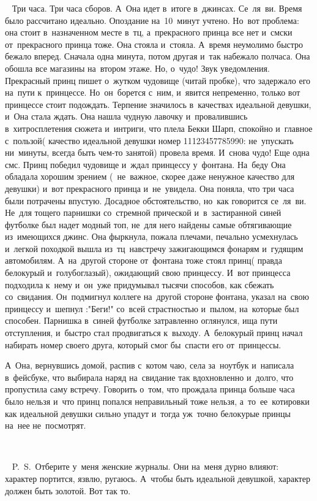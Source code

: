~
Три часа.
Три часа сборов.
А~Она идет в~итоге в~джинсах.
Се~ля~ви.
Время было рассчитано идеально.
Опоздание на~10~минут учтено.
Но~вот проблема: она стоит в~назначенном месте в~тц, а~прекрасного принца все нет и~смски от~прекрасного принца тоже.
Она стояла и~стояла.
А~время неумолимо быстро бежало вперед.
Сначала одна минута, потом другая и~так набежало полчаса.
Она обошла все магазины на~втором этаже.
Но, о~чудо! Звук уведомления.
Прекрасный принц пишет о~жутком чудовище (читай пробке), что задержало его на~пути к~принцессе.
Но~он~борется с~ним, и~явится непременно, только вот принцессе стоит подождать.
Терпение значилось в~качествах идеальной девушки, и~Она стала ждать.
Она нашла чудную лавочку и~провалившись в~хитросплетения сюжета и~интриги, что плела Бекки Шарп, спокойно и~главное с~пользой( качество идеальной девушки номер 11123457785990: не~упускать ни~минуты, всегда быть чем-то занятой) провела время.
И~снова чудо! Еще одна смс.
Принц победил чудовище и~ждал принцессу у~фонтана.
На~беду Она обладала хорошим зрением (~не~важное, скорее даже ненужное качество для девушки) и~вот прекрасного принца и~не~увидела.
Она поняла, что три часа были потрачены впустую.
Досадное обстоятельство, но~как говорится се~ля~ви.
Не~для тощего парнишки со~стремной прической и~в~застиранной синей футболке был надет модный топ, не~для него найдены самые обтягивающие из~имеющихся джинс.
Она фыркнула, пожала плечами, печально усмехнулась и~легкой походкой вышла из~тц~навстречу зажигающимся фонарям и~гудящим автомобилям.
А~на~другой стороне от~фонтана тоже стоял принц( правда белокурый и~голубоглазый), ожидающий свою принцессу.
И~вот принцесса подходила к~нему и~он~уже придумывал тысячи способов, как сбежать со~свидания.
Он~подмигнул коллеге на~другой стороне фонтана, указал на~свою принцессу и~шепнул :"Беги!" со~всей страстностью и~пылом, на~которые был способен.
Парнишка в~синей футболке затравленно оглянулся, ища пути отступления, и~быстро стал продвигаться к~выходу.
А~белокурый принц начал набирать номер своего друга, который смог бы~спасти его от~принцессы.

А~Она, вернувшись домой, распив с~котом чаю, села за~ноутбук и~написала в~фейсбуке, что выбирала наряд на~свидание так вдохновленно и~долго, что пропустила саму встречу.
Говорить о~том, что прождала принца больше часа было нельзя и~что принц попался неправильный тоже нельзя, а~то~ее~котировки как идеальной девушки сильно упадут и~тогда уж~точно белокурые принцы на~нее не~посмотрят.
 

~

~
P.~S.~Отберите у~меня женские журналы.
Они на~меня дурно влияют: характер портится, язвлю, ругаюсь.
А~чтобы быть идеальной девушкой, характер должен быть золотой.
Вот так то.


